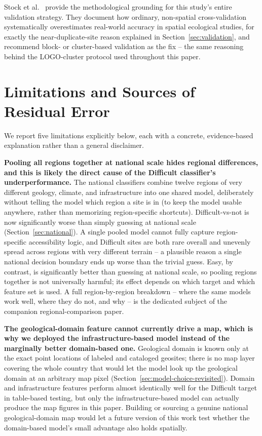 \documentclass[11pt,a4paper]{article}
\begin{document}
Stock et al.~\citep{stock2023} provide the methodological grounding for this study's entire validation strategy. They document how ordinary, non-spatial cross-validation systematically overestimates real-world accuracy in spatial ecological studies, for exactly the near-duplicate-site reason explained in Section~\ref{sec:validation}, and recommend block- or cluster-based validation as the fix -- the same reasoning behind the LOGO-cluster protocol used throughout this paper.

\section{Limitations and Sources of Residual Error}
\label{sec:limits}
We report five limitations explicitly below, each with a concrete, evidence-based explanation rather than a general disclaimer.

\textbf{Pooling all regions together at national scale hides regional differences, and this is likely the direct cause of the Difficult classifier's underperformance.} The national classifiers combine twelve regions of very different geology, climate, and infrastructure into one shared model, deliberately without telling the model which region a site is in (to keep the model usable anywhere, rather than memorizing region-specific shortcuts). Difficult-vs-not is now significantly worse than simply guessing at national scale (Section~\ref{sec:national}). A single pooled model cannot fully capture region-specific accessibility logic, and Difficult sites are both rare overall and unevenly spread across regions with very different terrain -- a plausible reason a single national decision boundary ends up worse than the trivial guess. Easy, by contrast, is significantly better than guessing at national scale, so pooling regions together is not universally harmful; its effect depends on which target and which feature set is used. A full region-by-region breakdown -- where the same models work well, where they do not, and why -- is the dedicated subject of the companion regional-comparison paper.

\textbf{The geological-domain feature cannot currently drive a map, which is why we deployed the infrastructure-based model instead of the marginally better domain-based one.} Geological domain is known only at the exact point locations of labeled and cataloged geosites; there is no map layer covering the whole country that would let the model look up the geological domain at an arbitrary map pixel (Section~\ref{sec:model-choice-revisited}). Domain and infrastructure features perform almost identically well for the Difficult target in table-based testing, but only the infrastructure-based model can actually produce the map figures in this paper. Building or sourcing a genuine national geological-domain map would let a future version of this work test whether the domain-based model's small advantage also holds spatially.
\end{document}
